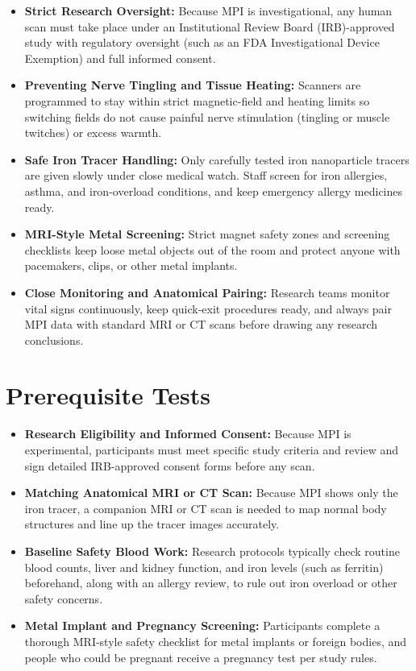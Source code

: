 \begin{itemize}
    \item \textbf{Strict Research Oversight:} Because MPI is investigational, any human scan must take place under an Institutional Review Board (IRB)-approved study with regulatory oversight (such as an FDA Investigational Device Exemption) and full informed consent.
    \item \textbf{Preventing Nerve Tingling and Tissue Heating:} Scanners are programmed to stay within strict magnetic-field and heating limits so switching fields do not cause painful nerve stimulation (tingling or muscle twitches) or excess warmth.
    \item \textbf{Safe Iron Tracer Handling:} Only carefully tested iron nanoparticle tracers are given slowly under close medical watch. Staff screen for iron allergies, asthma, and iron-overload conditions, and keep emergency allergy medicines ready.
    \item \textbf{MRI-Style Metal Screening:} Strict magnet safety zones and screening checklists keep loose metal objects out of the room and protect anyone with pacemakers, clips, or other metal implants.
    \item \textbf{Close Monitoring and Anatomical Pairing:} Research teams monitor vital signs continuously, keep quick-exit procedures ready, and always pair MPI data with standard MRI or CT scans before drawing any research conclusions.
\end{itemize}

\section{Prerequisite Tests}

\begin{itemize}
    \item \textbf{Research Eligibility and Informed Consent:} Because MPI is experimental, participants must meet specific study criteria and review and sign detailed IRB-approved consent forms before any scan.
    \item \textbf{Matching Anatomical MRI or CT Scan:} Because MPI shows only the iron tracer, a companion MRI or CT scan is needed to map normal body structures and line up the tracer images accurately.
    \item \textbf{Baseline Safety Blood Work:} Research protocols typically check routine blood counts, liver and kidney function, and iron levels (such as ferritin) beforehand, along with an allergy review, to rule out iron overload or other safety concerns.
    \item \textbf{Metal Implant and Pregnancy Screening:} Participants complete a thorough MRI-style safety checklist for metal implants or foreign bodies, and people who could be pregnant receive a pregnancy test per study rules.
\end{itemize}

